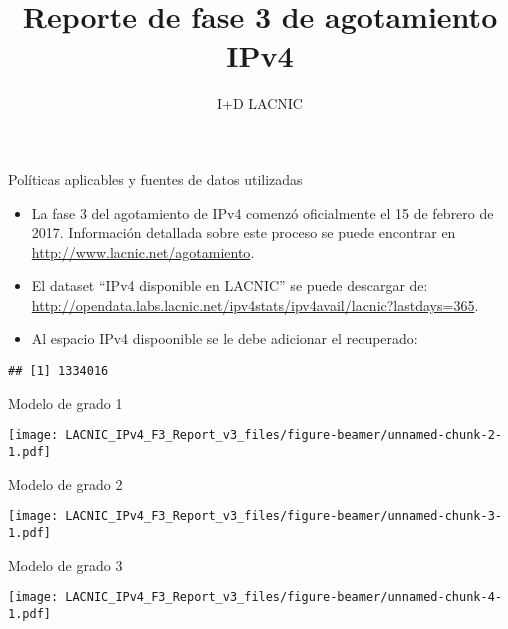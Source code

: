 \documentclass[ignorenonframetext,]{beamer}
\title{Reporte de fase 3 de agotamiento IPv4}
\author{I+D LACNIC}
\date{}
\begin{document}
\frame{\titlepage}

\begin{frame}[fragile]{Políticas aplicables y fuentes de datos
utilizadas}
\protect\hypertarget{poluxedticas-aplicables-y-fuentes-de-datos-utilizadas}{}

\begin{itemize}
\item
  La fase 3 del agotamiento de IPv4 comenzó oficialmente el 15 de
  febrero de 2017. Información detallada sobre este proceso se puede
  encontrar en \url{http://www.lacnic.net/agotamiento}.
\item
  El dataset ``IPv4 disponible en LACNIC'' se puede descargar de:
  \url{http://opendata.labs.lacnic.net/ipv4stats/ipv4avail/lacnic?lastdays=365}.
\item
  Al espacio IPv4 dispoonible se le debe adicionar el recuperado:
\end{itemize}

\begin{verbatim}
## [1] 1334016
\end{verbatim}

\end{frame}

\begin{frame}{Modelo de grado 1}
\protect\hypertarget{modelo-de-grado-1}{}

\texttt{[image: LACNIC\_IPv4\_F3\_Report\_v3\_files/figure-beamer/unnamed-chunk-2-1.pdf]}

\end{frame}

\begin{frame}{Modelo de grado 2}
\protect\hypertarget{modelo-de-grado-2}{}

\texttt{[image: LACNIC\_IPv4\_F3\_Report\_v3\_files/figure-beamer/unnamed-chunk-3-1.pdf]}

\end{frame}

\begin{frame}{Modelo de grado 3}
\protect\hypertarget{modelo-de-grado-3}{}

\texttt{[image: LACNIC\_IPv4\_F3\_Report\_v3\_files/figure-beamer/unnamed-chunk-4-1.pdf]}

\end{frame}
\end{document}
